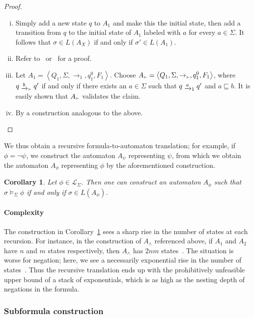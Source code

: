 \documentclass[a4paper]{article}
\newcommand{\angl}[1]{\left\langle#1\right\rangle}
\newcommand{\myrightarrow}[1]{\mathrel{\raisebox{-3pt}{$\xrightarrow{#1}$}}}
\newtheorem{corollary}{Corollary}
\theoremstyle{definition}
\newcommand{\captures}{\mathop{\Yright}}
\begin{document}
\begin{appendix}
\begin{proof}
\begin{enumerate}[(i)]
    \item Simply add a new state $q$ to $A_1$ and make this the initial state, then add a transition from $q$ to the initial state of $A_1$ labeled with $a$ for every $a \in \Sigma$. It follows that $\sigma \in L(A_X)$ if and only if $\sigma' \in L(A_1)$.
    \item Refer to~\cite{sistla-vardi-wolper-1985} or~\cite{safra-1988} for a proof.
    \item Let $A_1 = \angl{Q_1, \Sigma, \rightarrow_1, q^0_1, F_1}$. Choose $A_{\captures} = \angl{Q_1, \Sigma, \rightarrow_{\captures}, q^0_1, F_1}$, where $q \myrightarrow{b}_{\captures} q'$ if and only if there exists an $a \in \Sigma$ such that $q \myrightarrow{a}_1 q'$ and $a \sqsubseteq b$. It is easily shown that $A_{\captures}$ validates the claim.
    \item By a construction analogous to the above. \qedhere%
\end{enumerate}
\end{proof}

We thus obtain a recursive formula-to-automaton translation; for example, if $\phi = \neg \psi$, we construct the automaton $A_\psi$ representing $\psi$, from which we obtain the automaton $A_\phi$ representing $\phi$ by the aforementioned construction.
\begin{corollary}%
\label{corollary:recursive-construction}
Let $\phi \in \mathcal{L}_\Sigma$. Then one can construct an automaton $A_\phi$ such that $\sigma \models_\Sigma \phi$ if and only if $\sigma \in L(A_\phi)$.
\end{corollary}

\paragraph{Complexity}
The construction in Corollary~\ref{corollary:recursive-construction} sees a sharp rise in the number of states at each recursion. For instance, in the construction of $A_\wedge$ referenced above, if $A_1$ and $A_2$ have $n$ and $m$ states respectively, then $A_\wedge$ has $2nm$ states~\cite{choueka-1974}. The situation is worse for negation; here, we see a necessarily exponential rise in the number of states~\cite{safra-1988}. Thus the recursive translation ends up with the prohibitively unfeasible upper bound of a stack of exponentials, which is as high as the nesting depth of negations in the formula.

\subsubsection{Subformula construction}


\end{appendix}
\end{document}
